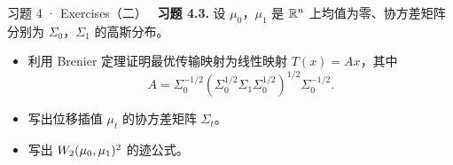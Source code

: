 \begin{frame}{习题 4 · Exercises（二）}
  \diffIII\ \textbf{习题 4.3.} 设 $\mu_{0}$，$\mu_{1}$ 是 $\mathbb{R}^{n}$ 上均值为零、协方差矩阵分别为
  $\Sigma_{0}$，$\Sigma_{1}$ 的高斯分布。
  \begin{itemize}
    \item[(a)] 利用 Brenier 定理证明最优传输映射为线性映射 $T(x)=Ax$，其中
      \[
        A=\Sigma_{0}^{-1/2}\!\left(\Sigma_{0}^{1/2}\Sigma_{1}\Sigma_{0}^{1/2}\right)^{1/2}\!\Sigma_{0}^{-1/2}.
      \]
    \item[(b)] 写出位移插值 $\mu_{t}$ 的协方差矩阵 $\Sigma_{t}$。
    \item[(c)] 写出 $W_{2}(\mu_{0},\mu_{1})^{2}$ 的迹公式。
  \end{itemize}

\end{frame}
